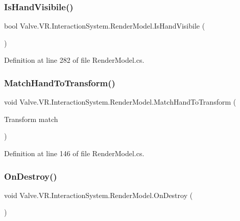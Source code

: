 \subsubsection{\texorpdfstring{IsHandVisibile()}{IsHandVisibile()}}
{\footnotesize\ttfamily bool Valve.\+V\+R.\+Interaction\+System.\+Render\+Model.\+Is\+Hand\+Visibile (\begin{DoxyParamCaption}{ }\end{DoxyParamCaption})}



Definition at line 282 of file Render\+Model.\+cs.

\mbox{\label{class_valve_1_1_v_r_1_1_interaction_system_1_1_render_model_a040cf81706709d85a9b649e35e09ca8a}} 
\subsubsection{\texorpdfstring{MatchHandToTransform()}{MatchHandToTransform()}}
{\footnotesize\ttfamily void Valve.\+V\+R.\+Interaction\+System.\+Render\+Model.\+Match\+Hand\+To\+Transform (\begin{DoxyParamCaption}\item[{Transform}]{match }\end{DoxyParamCaption})}



Definition at line 146 of file Render\+Model.\+cs.

\mbox{\label{class_valve_1_1_v_r_1_1_interaction_system_1_1_render_model_a26fe308a8c7213d63ff697b316bc4124}} 
\subsubsection{\texorpdfstring{OnDestroy()}{OnDestroy()}}
{\footnotesize\ttfamily void Valve.\+V\+R.\+Interaction\+System.\+Render\+Model.\+On\+Destroy (\begin{DoxyParamCaption}{ }\end{DoxyParamCaption})\hspace{0.3cm}{\ttfamily [protected]}}



